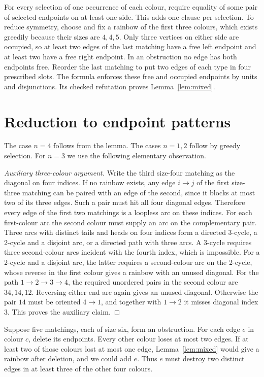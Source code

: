 \documentclass[10pt]{article}
\begin{document}
For every selection of one occurrence of each colour, require equality of
some pair of selected endpoints on at least one side. This adds one clause
per selection. To reduce symmetry, choose and fix a rainbow of the first
three colours, which exists greedily because their sizes are \(4,4,5\).
Only three vertices on either side are occupied, so at least two edges of
the last matching have a free left endpoint and at least two have a free
right endpoint. In an obstruction no edge has both endpoints free. Reorder
the last matching to put two edges of each type in four prescribed slots.
The formula enforces these free and occupied endpoints by units and
disjunctions. Its checked refutation proves Lemma~\ref{lem:mixed}.

\section{Reduction to endpoint patterns}
The case \(n=4\) follows from the lemma. The cases \(n=1,2\) follow by
greedy selection. For \(n=3\) we use the following elementary observation.

\begin{proof}[Auxiliary three-colour argument]
Write the third size-four matching as the diagonal on four indices.
If no rainbow exists, any edge \(i\to j\) of the first size-three matching
can be paired with an edge of the second, since it blocks at most two of
its three edges. Such a pair must hit all four diagonal edges. Therefore
every edge of the first two matchings is a loopless arc on these indices.
For each first-colour arc the second colour must supply an arc on the
complementary pair. Three arcs with distinct tails and heads on four
indices form a directed 3-cycle, a 2-cycle and a disjoint arc, or a directed
path with three arcs. A 3-cycle requires three second-colour arcs incident
with the fourth index, which is impossible. For a 2-cycle and a disjoint
arc, the latter requires a second-colour arc on the 2-cycle, whose reverse
in the first colour gives a rainbow with an unused diagonal. For the path
\(1\to2\to3\to4\), the required unordered pairs in the second colour are
\(34,14,12\). Reversing either end arc again gives an unused diagonal.
Otherwise the pair \(14\) must be oriented \(4\to1\), and together with
\(1\to2\) it misses diagonal index 3. This proves the auxiliary claim.
\end{proof}

Suppose five matchings, each of size six, form an obstruction. For each
edge \(e\) in colour \(c\), delete its endpoints. Every other colour loses at
most two edges. If at least two of those colours lost at most one edge,
Lemma~\ref{lem:mixed} would give a rainbow after deletion, and we could add
\(e\). Thus \(e\) must destroy two distinct edges in at least three of the
other four colours.
\end{document}
